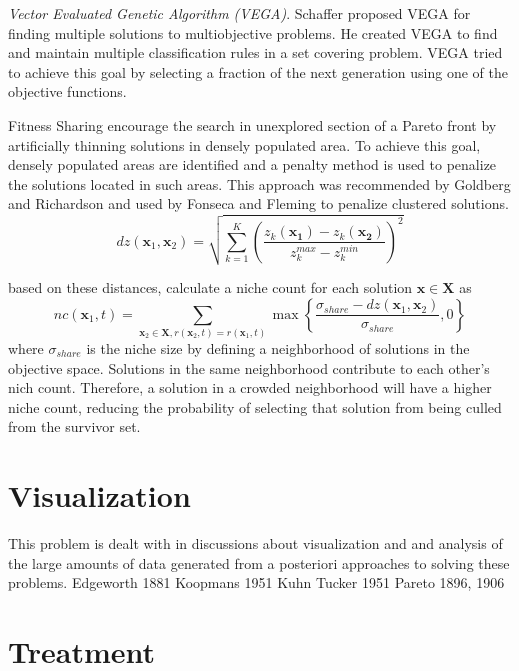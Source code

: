 \emph{Vector Evaluated Genetic Algorithm (VEGA)}.  Schaffer proposed VEGA for finding multiple solutions to multiobjective problems.  He created VEGA to find and maintain multiple classification rules in a set covering problem.  VEGA tried to achieve this goal by selecting a fraction of the next generation using one of the objective functions.

Fitness Sharing encourage the search in unexplored section of a Pareto front by artificially thinning solutions in densely populated area.  To achieve this goal, densely populated areas are identified and a penalty method is used to penalize the solutions located in such areas.  This approach was recommended by Goldberg and Richardson\cite{goldberg1987genetic} and used by Fonseca and Fleming\cite{fonseca1993multiobjective} to penalize clustered solutions.
\begin{equation}
    dz(\bm{x}_1,\bm{x}_2)
    = \sqrt{\sum_{k=1}^{K}  \left(\frac{z_k(\bm{x_1})-z_k(\bm{x_2})}
                                       {z_{k}^{max}-z_{k}^{min}}
                            \right)^{2}
      }
\end{equation}

based on these distances, calculate a niche count for each solution $\bm{x}\in\bm{X}$ as
\begin{equation}
  nc(\bm{x}_1,t)=\sum_{\bm{x}_2\in\bm{X},r(\bm{x}_2,t)=r(\bm{x}_1,t)}
      \max\left\{ \frac{\sigma_{share}-dz(\bm{x}_1,\bm{x}_2)}
                       {\sigma_{share}},0
          \right\}
\end{equation}
where $\sigma_{share}$ is the niche size by defining a neighborhood of solutions in the objective space.  Solutions in the same neighborhood contribute to each other's nich count.  Therefore, a solution in a crowded neighborhood will have a higher niche count, reducing the probability of selecting that solution from being culled from the survivor set.

\section{Visualization}
This problem is dealt with in discussions about visualization and and analysis of the large amounts of data generated from a posteriori approaches to solving these problems.
Edgeworth 1881
Koopmans 1951
Kuhn Tucker 1951
Pareto 1896, 1906
\section{Treatment}

